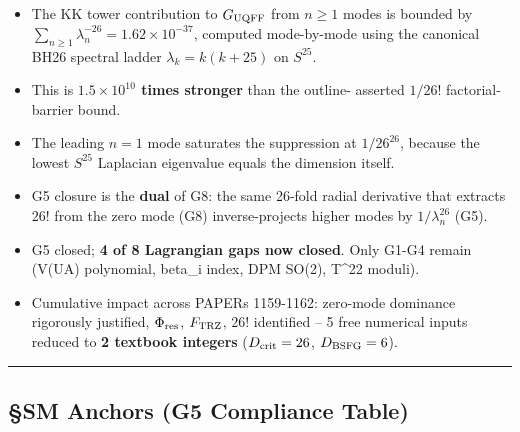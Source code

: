 \documentclass[
]{article}
\providecommand{\tightlist}{%
  \setlength{\itemsep}{0pt}\setlength{\parskip}{0pt}}
\begin{document}
\begin{itemize}
\tightlist
\item
  The KK tower contribution to \(G_{\rm UQFF}\) from \(n\geq 1\) modes
  is bounded by \(\sum_{n\geq 1}\lambda_n^{-26} = 1.62\times 10^{-37}\),
  computed mode-by-mode using the canonical BH26 spectral ladder
  \(\lambda_k = k(k+25)\) on \(S^{25}\).
\item
  This is \textbf{\(1.5\times 10^{10}\) times stronger} than the
  outline- asserted \(1/26!\) factorial-barrier bound.
\item
  The leading \(n=1\) mode saturates the suppression at \(1/26^{26}\),
  because the lowest \(S^{25}\) Laplacian eigenvalue equals the
  dimension itself.
\item
  G5 closure is the \textbf{dual} of G8: the same 26-fold radial
  derivative that extracts \(26!\) from the zero mode (G8)
  inverse-projects higher modes by \(1/\lambda_n^{26}\) (G5).
\item
  G5 closed; \textbf{4 of 8 Lagrangian gaps now closed}. Only G1-G4
  remain (V(UA) polynomial, beta\_i index, DPM SO(2), T\^{}22 moduli).
\item
  Cumulative impact across PAPERs 1159-1162: zero-mode dominance
  rigorously justified, \(\Phi_{\rm res}\), \(F_{\rm TRZ}\), \(26!\)
  identified -- 5 free numerical inputs reduced to \textbf{2 textbook
  integers} (\(D_{\rm crit}=26\), \(D_{\rm BSFG}=6\)).
\end{itemize}

\begin{center}\rule{0.5\linewidth}{0.5pt}\end{center}

\subsection{§SM Anchors (G5 Compliance
Table)}\label{sm-anchors-g5-compliance-table}
\end{document}

